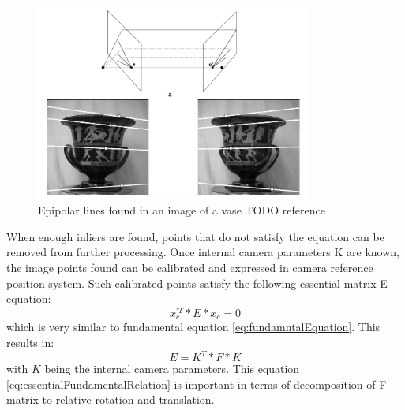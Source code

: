 \begin{figure}[p]
    \centering
    \includegraphics[width=0.8\textwidth]{EpipolarGeometry}
    \caption{Epipolar lines found in an image of a vase TODO reference}
    \label{fig:EpipolarGeometry}
\end{figure}
When enough inliers are found, points that do not satisfy the equation can be removed from further processing.
Once internal camera parameters K are known, the image points found can be calibrated and expressed in camera reference position system. Such calibrated points satisfy the following essential matrix E equation:
\begin{equation} \label{eq:essentialEquation}
{x}_{c}^{'T} * E * x_{c} = 0
\end{equation} 
which is very similar to fundamental equation \ref{eq:fundamntalEquation}. This results in:
\begin{equation} \label{eq:essentialFundamentalRelation}
E = K^{T} * F * K
\end{equation} 
with $K$ being the internal camera parameters. This equation \ref{eq:essentialFundamentalRelation} is important in terms of decomposition of F matrix to relative rotation and translation.
